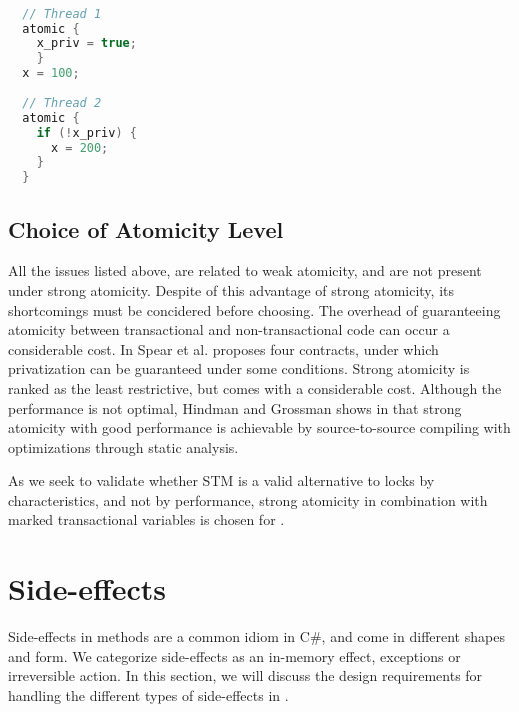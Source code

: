 \begin{lstlisting}[label=lst:privatization,
  caption={Privatization issue},
  language=Java,  
  showspaces=false,
  showtabs=false,
  breaklines=true,
  showstringspaces=false,
  breakatwhitespace=true,
  commentstyle=\color{greencomments},
  keywordstyle=\color{bluekeywords},
  stringstyle=\color{redstrings},
  morekeywords={atomic, retry, orElse, var, get, set}]  % Start your code-block

  // Thread 1
  atomic {
    x_priv = true;
    }
  x = 100;
  
  // Thread 2
  atomic {
    if (!x_priv) {
      x = 200;
    }
  }
\end{lstlisting}

\subsection{Choice of Atomicity Level}
All the issues listed above, are related to weak atomicity, and are not present under strong atomicity. Despite of this advantage of strong atomicity, its shortcomings must be concidered before choosing. The overhead of guaranteeing atomicity between transactional and non-transactional code can occur a considerable cost\cite{spear2007privatization}. In \cite{spear2007privatization} Spear et al. proposes four contracts, under which privatization can be guaranteed under some conditions. Strong atomicity is ranked as the least restrictive, but comes with a considerable cost. Although the performance is not optimal, Hindman and Grossman shows in \cite{hindman2006atomicity} that strong atomicity with good performance is achievable by source-to-source compiling with optimizations through static analysis.

As we seek to validate whether \ac{STM} is a valid alternative to locks by characteristics, and not by performance, strong atomicity in combination with marked transactional variables is chosen for \stmname.

\section{Side-effects}\label{sec:side-effects}
Side-effects in methods are a common idiom in C\#, and come in different shapes and form. We categorize side-effects as an in-memory effect, exceptions or irreversible action. In this section, we will discuss the design requirements for handling the different types of side-effects in \stmname.


